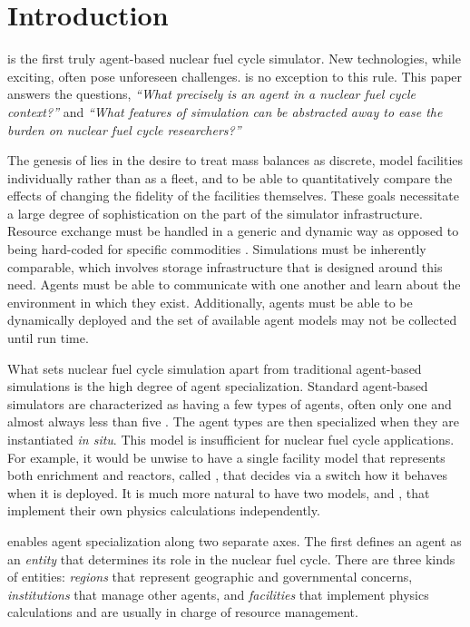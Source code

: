 \section{Introduction}
\label{sec-intro}

\Cyclus \cite{cyclus_v1_0,cyclus_v1_2,huff_fundamental_2016} is the first truly agent-based 
\cite{jennings2000agent} nuclear fuel cycle simulator. 
New technologies, while exciting, often pose unforeseen challenges.
\Cyclus is no exception to this rule.  This paper answers the questions,
\emph{``What precisely is an agent in a nuclear fuel cycle context?''} and 
\emph{``What features of simulation can be abstracted away to ease the burden 
on nuclear fuel cycle researchers?''}

The genesis of \cyclus lies in the desire to 
treat mass balances as discrete, model facilities individually rather than as 
a fleet, and to be able to quantitatively compare the effects of changing the 
fidelity of the facilities themselves. These goals necessitate a large degree of 
sophistication on the part of the simulator infrastructure.  Resource exchange
must be handled in a generic and dynamic way as opposed to being hard-coded 
for specific commodities \cite{Gidden2016}. Simulations must be inherently comparable, which involves 
storage infrastructure that is designed around this need. Agents must be able 
to communicate with one another and learn about the environment in which they 
exist. Additionally, agents must be able to be dynamically deployed and the set of 
available agent models may not be collected until run time. 

What sets nuclear fuel cycle simulation apart from traditional agent-based simulations 
is the high degree of agent specialization. Standard agent-based simulators
are characterized as having a few types of agents, often only one and 
almost always less than five \cite{taylor2014agent}. The agent types are then 
specialized 
when they are instantiated \emph{in situ}. This model is insufficient for 
nuclear fuel cycle applications.  For example, it would be unwise to have a single facility model 
that represents both enrichment and reactors, called ,
that decides via a switch how it behaves when it is deployed. It is much 
more natural to have two models,  and , 
that implement their own physics calculations independently.

\Cyclus enables agent specialization along two separate axes. The first defines 
an agent as an \emph{entity} that determines its role in the 
nuclear fuel cycle. There are three kinds of entities: \emph{regions} that 
represent geographic and governmental concerns, \emph{institutions} 
that manage other agents, and \emph{facilities} that implement 
physics calculations and are usually in charge of resource management.

